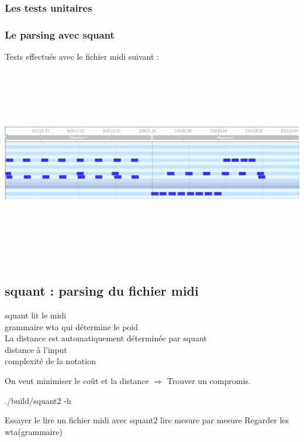 \subsubsection{Les tests unitaires}
\subsubsection{Le parsing avec squant}
Tests effectués avec le fichier midi suivant :\\\\
\includegraphics[height=80mm, width=160mm]{z_images/4_experimentations/input_parsing/midi_2bars_fill.png}\\\\

\subsection*{squant : parsing du fichier midi}
squant lit le midi\\
grammaire wta qui détermine le poid\\
La distance est automatiquement déterminée par squant\\
distance à l’input\\
complexité de la notation

On veut minimiser le coût et la distance $\Rightarrow$ Trouver un compromis.

./build/squant2 -h

Essayer le lire un fichier midi avec squant2
lire mesure par mesure
Regarder les wta(grammaire)

